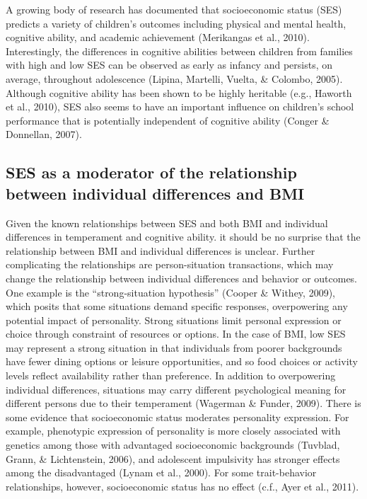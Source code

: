 \documentclass[man]{apa6}
\begin{document}
A growing body of research has documented that socioeconomic status (SES) predicts a variety of children's outcomes including physical and mental health, cognitive ability, and academic achievement (Merikangas et al., 2010). Interestingly, the differences in cognitive abilities between children from families with high and low SES can be observed as early as infancy and persists, on average, throughout adolescence (Lipina, Martelli, Vuelta, \& Colombo, 2005). Although cognitive ability has been shown to be highly heritable (e.g., Haworth et al., 2010), SES also seems to have an important influence on children's school performance that is potentially independent of cognitive ability (Conger \& Donnellan, 2007).

\hypertarget{ses-as-a-moderator-of-the-relationship-between-individual-differences-and-bmi}{%
\subsection{SES as a moderator of the relationship between individual differences and BMI}\label{ses-as-a-moderator-of-the-relationship-between-individual-differences-and-bmi}}

Given the known relationships between SES and both BMI and individual differences in temperament and cognitive ability. it should be no surprise that the relationship between BMI and individual differences is unclear. Further complicating the relationships are person-situation transactions, which may change the relationship between individual differences and behavior or outcomes. One example is the \enquote{strong-situation hypothesis} (Cooper \& Withey, 2009), which posits that some situations demand specific responses, overpowering any potential impact of personality. Strong situations limit personal expression or choice through constraint of resources or options. In the case of BMI, low SES may represent a strong situation in that individuals from poorer backgrounds have fewer dining options or leisure opportunities, and so food choices or activity levels reflect availability rather than preference. In addition to overpowering individual differences, situations may carry different psychological meaning for different persons due to their temperament (Wagerman \& Funder, 2009). There is some evidence that socioeconomic status moderates personality expression. For example, phenotypic expression of personality is more closely associated with genetics among those with advantaged socioeconomic backgrounds (Tuvblad, Grann, \& Lichtenstein, 2006), and adolescent impulsivity has stronger effects among the disadvantaged (Lynam et al., 2000). For some trait-behavior relationships, however, socioeconomic status has no effect (c.f., Ayer et al., 2011).
\end{document}
